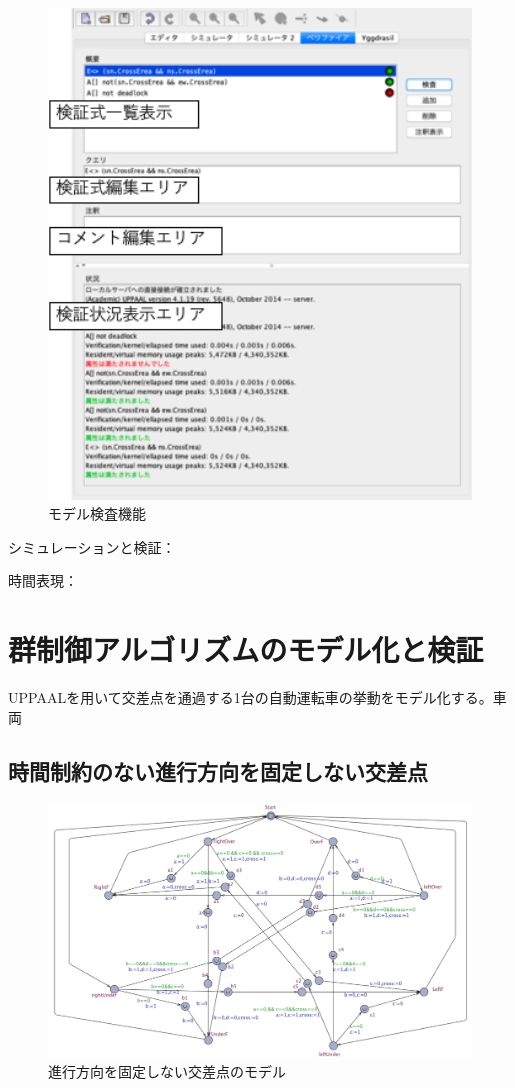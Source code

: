 \documentclass{tpu-sotu}
\begin{document}
	\begin{figure}[htbp]
	\centering
	\includegraphics[width=140mm]{showModelVerification.png}
	\caption{モデル検査機能}
	\label{sMV}
	\end{figure}
	シミュレーションと検証：
	
	時間表現：
	
\chapter{群制御アルゴリズムのモデル化と検証}
UPPAALを用いて交差点を通過する1台の自動運転車の挙動をモデル化する。車両
	\section{時間制約のない進行方向を固定しない交差点}
	\begin{figure}[htbp]
	\centering
	\includegraphics[width=155mm]{IntersectionBig.png}
	\caption{進行方向を固定しない交差点のモデル}
	\label{IB}
	\end{figure}
	
\end{document}
